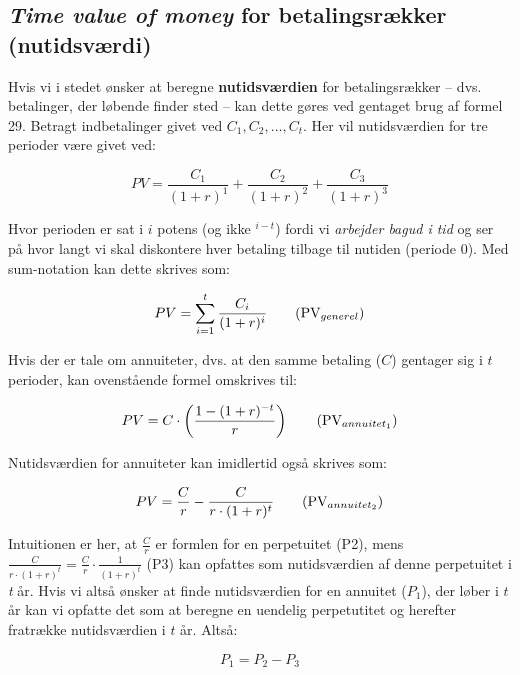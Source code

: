 \documentclass[10pt,reqno, usenames]{article}
\begin{document}
\newpage
\subsection{\textit{Time value of money} for betalingsrækker (nutidsværdi)}
Hvis vi i stedet ønsker at beregne \textbf{nutidsværdien} for betalingsrækker – dvs. betalinger, der løbende finder sted – kan dette gøres ved gentaget brug af formel 29. Betragt indbetalinger givet ved $C_1, C_2, \ldots, C_t$. Her vil nutidsværdien for tre perioder være givet ved:

\begin{equation}
    PV = \frac{C_1}{(1 + r)^1} + \frac{C_2}{(1 + r)^2} + \frac{C_3}{(1 + r)^3}
\end{equation}

Hvor perioden er sat i $i$ potens (og ikke $^{i-t}$) fordi vi \textit{arbejder bagud i tid} og ser på hvor langt vi skal diskontere hver betaling tilbage til nutiden (periode 0).  Med sum-notation kan dette skrives som:

\begin{equation*}
PV = \sum_{i=1}^{t} \frac{C_i}{(1 + r)^i} \tag{PV$_{generel}$}
\end{equation*}

Hvis der er tale om annuiteter, dvs. at den samme betaling ($C$) gentager sig i $t$ perioder, kan ovenstående formel omskrives til:

\begin{equation*}
PV = C \cdot \left( \frac{1 - (1 + r)^{-t}}{r} \right) \tag{PV$_{annuitet_1}$}
\end{equation*}

Nutidsværdien for annuiteter kan imidlertid også skrives som: 

\begin{equation}
    PV = \frac{C}{r} - \frac{C}{r \cdot (1+r)^t} \tag{PV$_{annuitet_2}$}
\end{equation}

Intuitionen er her, at $\frac{C}{r}$ er formlen for en perpetuitet (P2), mens $\frac{C}{r \cdot (1+r)^t} = \frac{C}{r} \cdot \frac{1}{(1+r)^t}$ (P3) kan opfattes som nutidsværdien af denne perpetuitet i \textit{t} år. Hvis vi altså ønsker at finde nutidsværdien for en annuitet ($P_1$), der løber i $t$ år kan vi opfatte det som at beregne en uendelig perpetutitet og herefter fratrække nutidsværdien i $t$ år. Altså: 

\begin{equation*}
    P_1 = P_2 - P_3
\end{equation*}
\end{document}
